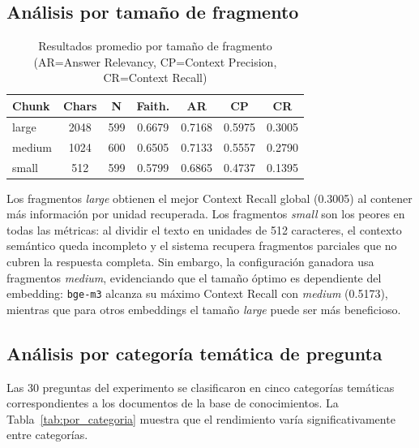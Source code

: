 \documentclass{article}
\begin{document}
\subsection{Análisis por tamaño de fragmento}

\begin{table}[H]
\centering
\begin{tabular}{|l|c|c|c|c|c|c|}
\hline
\textbf{Chunk} & \textbf{Chars} & \textbf{N} & \textbf{Faith.} & \textbf{AR} & \textbf{CP} & \textbf{CR} \\
\hline
large  & 2048 & 599 & 0.6679 & 0.7168 & 0.5975 & 0.3005 \\
medium & 1024 & 600 & 0.6505 & 0.7133 & 0.5557 & 0.2790 \\
small  &  512 & 599 & 0.5799 & 0.6865 & 0.4737 & 0.1395 \\
\hline
\end{tabular}
\caption{Resultados promedio por tamaño de fragmento (AR=Answer Relevancy, CP=Context Precision, CR=Context Recall)}
\label{tab:por_chunk}
\end{table}

Los fragmentos \textit{large} obtienen el mejor Context Recall global (0.3005)
al contener más información por unidad recuperada. Los fragmentos \textit{small}
son los peores en todas las métricas: al dividir el texto en unidades de 512
caracteres, el contexto semántico queda incompleto y el sistema recupera
fragmentos parciales que no cubren la respuesta completa. Sin embargo, la
configuración ganadora usa fragmentos \textit{medium}, evidenciando que el
tamaño óptimo es dependiente del embedding: \texttt{bge-m3} alcanza su máximo
Context Recall con \textit{medium} (0.5173), mientras que para otros embeddings
el tamaño \textit{large} puede ser más beneficioso.

\subsection{Análisis por categoría temática de pregunta}

Las 30 preguntas del experimento se clasificaron en cinco categorías temáticas
correspondientes a los documentos de la base de conocimientos. La
Tabla~\ref{tab:por_categoria} muestra que el rendimiento varía
significativamente entre categorías.
\end{document}
